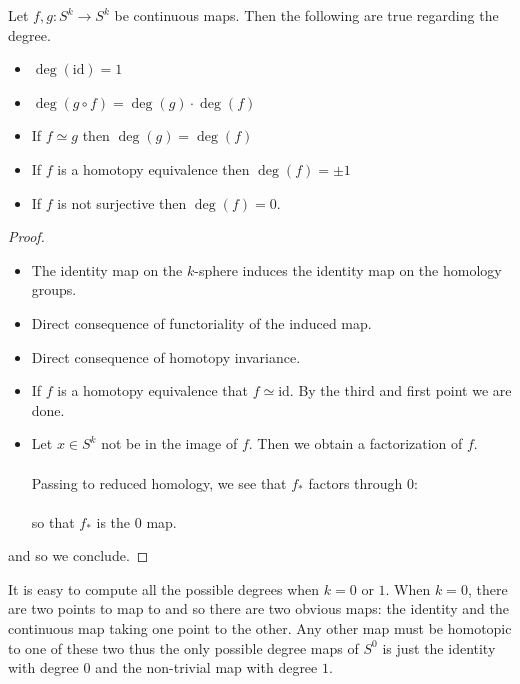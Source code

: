 \documentclass[a4paper]{article}
\begin{document}
\begin{lmm}{}{} Let $f,g:S^k\to S^k$ be continuous maps. Then the following are true regarding the degree. 
\begin{itemize}
\item $\deg(\text{id})=1$
\item $\deg(g\circ f)=\deg(g)\cdot\deg(f)$
\item If $f\simeq g$ then $\deg(g)=\deg(f)$
\item If $f$ is a homotopy equivalence then $\deg(f)=\pm1$
\item If $f$ is not surjective then $\deg(f)=0$. 
\end{itemize} 
\begin{proof}~\\
\begin{itemize}
\item The identity map on the $k$-sphere induces the identity map on the homology groups. 
\item Direct consequence of functoriality of the induced map. 
\item Direct consequence of homotopy invariance. 
\item If $f$ is a homotopy equivalence that $f\simeq\text{id}$. By the third and first point we are done. 
\item Let $x\in S^k$ not be in the image of $f$. Then we obtain a factorization of $f$. \\
\\
Passing to reduced homology, we see that $f_\ast$ factors through $0$: \\
\\
so that $f_\ast$ is the $0$ map. 
\end{itemize} 
and so we conclude. 
\end{proof}
\end{lmm}

It is easy to compute all the possible degrees when $k=0$ or $1$. When $k=0$, there are two points to map to and so there are two obvious maps: the identity and the continuous map taking one point to the other. Any other map must be homotopic to one of these two thus the only possible degree maps of $S^0$ is just the identity with degree $0$ and the non-trivial map with degree $1$. \\
\end{document}
